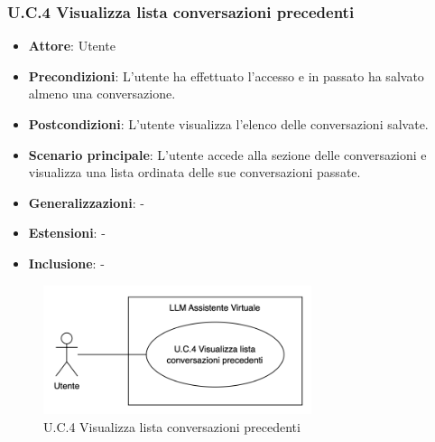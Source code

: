 \subsubsection{U.C.4 Visualizza lista conversazioni precedenti}
\begin{itemize}
    \item \textbf{Attore}: Utente
    \item \textbf{Precondizioni}: L'utente ha effettuato l'accesso e in passato ha salvato almeno una conversazione.
    \item \textbf{Postcondizioni}: L'utente visualizza l'elenco delle conversazioni salvate.
    \item \textbf{Scenario principale}: L'utente accede alla sezione delle conversazioni e visualizza una lista ordinata delle sue conversazioni passate.
    \item \textbf{Generalizzazioni}: -
    \item \textbf{Estensioni}: -
    \item \textbf{Inclusione}: -
\end{itemize}
\begin{figure}[H]
    \centering
    \includegraphics[width=0.7\textwidth]{img/UC4.png}
    \caption{U.C.4 Visualizza lista conversazioni precedenti}
\end{figure}
\newpage

